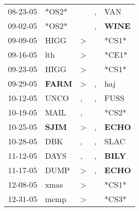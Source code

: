 \begin{supertabular}{p{0.07\textwidth}p{0.06\textwidth}p{0.02\textwidth}p{0.02\textwidth}p{0.06\textwidth}}
          08-23-05\textsuperscript{} &                            *OS2* &                  &                , &            VAN\textsuperscript{} \\
          09-02-05\textsuperscript{} &                            *OS2* &                  &                , &  \textbf{WINE\textsuperscript{}} \\
          09-09-05\textsuperscript{} &           HIGG\textsuperscript{} &     \textgreater &                  &                            *CS1* \\
          09-16-05\textsuperscript{} &            lth\textsuperscript{} &     \textgreater &                  &                            *CE1* \\
          09-23-05\textsuperscript{} &           HIGG\textsuperscript{} &     \textgreater &                  &                            *CS1* \\
          09-29-05\textsuperscript{} &  \textbf{FARM\textsuperscript{}} &     \textgreater &                , &            haj\textsuperscript{} \\
          10-12-05\textsuperscript{} &           UNCO\textsuperscript{} &                , &                , &           FUSS\textsuperscript{} \\
          10-19-05\textsuperscript{} &           MAIL\textsuperscript{} &                , &                  &                            *CS2* \\
          10-25-05\textsuperscript{} &  \textbf{SJIM\textsuperscript{}} &     \textgreater &                , &  \textbf{ECHO\textsuperscript{}} \\
          10-28-05\textsuperscript{} &            DBK\textsuperscript{} &                , &                , &           SLAC\textsuperscript{} \\
          11-12-05\textsuperscript{} &           DAYS\textsuperscript{} &                , &                , &  \textbf{BILY\textsuperscript{}} \\
          11-17-05\textsuperscript{} &           DUMP\textsuperscript{} &     \textgreater &                , &  \textbf{ECHO\textsuperscript{}} \\
          12-08-05\textsuperscript{} &           xmas\textsuperscript{} &     \textgreater &                  &                            *CS1* \\
          12-31-05\textsuperscript{} &           memp\textsuperscript{} &     \textgreater &                  &                            *CS3* \\

\end{supertabular}
